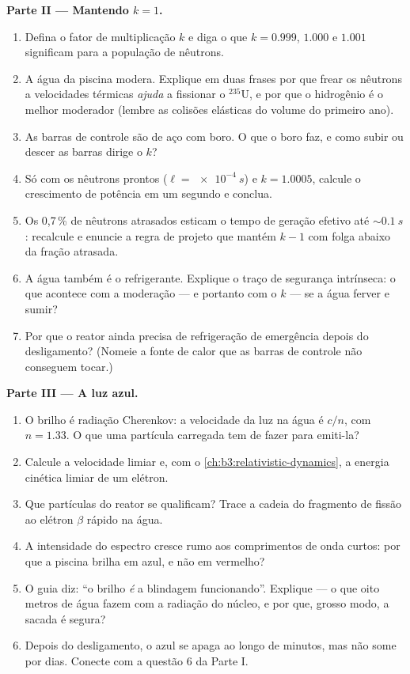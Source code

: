 \begin{problem}
\medskip\noindent\textbf{Parte II --- Mantendo $k = 1$.}

\begin{enumerate}[resume]
  \item Defina o fator de multiplicação $k$ e diga o que
        $k = 0.999$, $1.000$ e $1.001$ significam para a população
        de nêutrons.
  \item A água da piscina modera. Explique em duas frases por que
        frear os nêutrons a velocidades térmicas \emph{ajuda} a fissionar
        o $^{235}$U, e por que o hidrogênio é o melhor moderador
        (lembre as colisões elásticas do volume do primeiro ano).
  \item As barras de controle são de aço com boro. O que o boro faz, e
        como subir ou descer as barras dirige o $k$?
  \item Só com os nêutrons prontos ($\ell = \qty{e-4}{s}$) e
        $k = 1.0005$, calcule o crescimento de potência em um segundo
        e conclua.
  \item Os 0,7\,\% de nêutrons atrasados esticam o tempo de geração
        efetivo até $\sim\qty{0.1}{s}$: recalcule e
        enuncie a regra de projeto que mantém $k - 1$ com folga abaixo
        da fração atrasada.
  \item A água também é o refrigerante. Explique o traço de segurança
        intrínseca: o que acontece com a moderação --- e portanto
        com o $k$ --- se a água ferver e sumir?
  \item Por que o reator ainda precisa de refrigeração de emergência
        depois do desligamento? (Nomeie a fonte de calor que as barras
        de controle não conseguem tocar.)
\end{enumerate}

\medskip\noindent\textbf{Parte III --- A luz azul.}

\begin{enumerate}[resume]
  \item O brilho é radiação Cherenkov: a velocidade da luz na água
        é $c/n$, com $n = 1.33$. O que uma partícula carregada tem
        de fazer para emiti-la?
  \item Calcule a velocidade limiar e, com o
        \cref{ch:b3:relativistic-dynamics}, a energia cinética
        limiar de um elétron.
  \item Que partículas do reator se qualificam? Trace a cadeia do
        fragmento de fissão ao elétron $\beta$ rápido na água.
  \item A intensidade do espectro cresce rumo aos comprimentos de onda
        curtos: por que a piscina brilha em azul, e não em vermelho?
  \item O guia diz: ``o brilho \emph{é} a blindagem
        funcionando''. Explique --- o que oito metros de água fazem
        com a radiação do núcleo, e por que, grosso modo, a sacada é segura?
  \item Depois do desligamento, o azul se apaga ao longo de minutos, mas
        não some por dias. Conecte com a questão 6 da Parte I.
\end{enumerate}


\end{problem}
